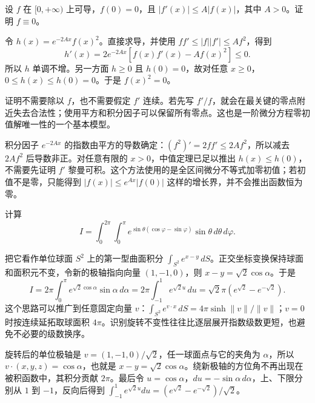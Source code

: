 \documentclass[UTF8,12pt,a4paper,fontset=fandol]{ctexart}
\begin{document}
\begin{example}\label{nm-2019-3}
设 $f$ 在 $[0,+\infty)$ 上可导，$f(0)=0$，且 $|f'(x)|\leq A|f(x)|$，其中 $A>0$。证明 $f\equiv0$。
\end{example}
\begin{solve}
令 $h(x)=e^{-2Ax}f(x)^2$。直接求导，并使用 $f f'\leq |f||f'|\leq A f^2$，得到
\[
 h'(x)=2e^{-2Ax}[f(x)f'(x)-Af(x)^2]\leq0.
\]
所以 $h$ 单调不增。另一方面 $h\geq0$ 且 $h(0)=0$，故对任意 $x\geq0$，$0\leq h(x)\leq h(0)=0$。于是 $f(x)^2=0$。

证明不需要除以 $f$，也不需要假定 $f'$ 连续。若先写 $f'/f$，就会在最关键的零点附近失去合法性；使用平方和积分因子可以保留所有零点。这也是一阶微分方程零初值解唯一性的一个基本模型。

积分因子 $e^{-2Ax}$ 的指数由平方的导数确定：$(f^2)'=2ff'\le2Af^2$，所以减去 $2Af^2$ 后导数非正。对任意有限的 $x>0$，中值定理已足以推出 $h(x)\le h(0)$，不需要先证明 $f'$ 黎曼可积。这个方法使用的是全区间微分不等式加零初值；若初值不是零，只能得到 $|f(x)|\le e^{Ax}|f(0)|$ 这样的增长界，并不会推出函数恒为零。

\end{solve}

\begin{example}\label{nm-2019-4}
计算
\[
 I=\int_0^{2\pi}\int_0^\pi
 e^{\sin\theta(\cos\varphi-\sin\varphi)}\sin\theta\,d\theta\,d\varphi.
\]
\end{example}
\begin{solve}
把它看作单位球面 $S^2$ 上的第一型曲面积分 $\int_{S^2}e^{x-y}\,dS$。正交坐标变换保持球面和面积元不变，令新的极轴指向向量 $(1,-1,0)$，则 $x-y=\sqrt2\cos\alpha$。于是
\[
 I=2\pi\int_0^\pi e^{\sqrt2\cos\alpha}\sin\alpha\,d\alpha
 =2\pi\int_{-1}^1e^{\sqrt2 u}\,du
 =\sqrt2\pi(e^{\sqrt2}-e^{-\sqrt2}).
\]
这个思路可以推广到任意固定向量 $v$：$\int_{S^2}e^{v\cdot x}\,dS=4\pi\sinh\|v\|/\|v\|$；$v=0$ 时按连续延拓取球面积 $4\pi$。识别旋转不变性往往比逐层展开指数级数更短，也避免不必要的级数换序。

旋转后的单位极轴是 $v=(1,-1,0)/\sqrt2$，任一球面点与它的夹角为 $\alpha$，所以 $v\cdot(x,y,z)=\cos\alpha$，也就是 $x-y=\sqrt2\cos\alpha$。绕新极轴的方位角不再出现在被积函数中，其积分贡献 $2\pi$。最后令 $u=\cos\alpha$，$du=-\sin\alpha\,d\alpha$，上、下限分别从 $1$ 到 $-1$，反向后得到 $\int_{-1}^1e^{\sqrt2u}du=(e^{\sqrt2}-e^{-\sqrt2})/\sqrt2$。

\end{solve}
\end{document}
